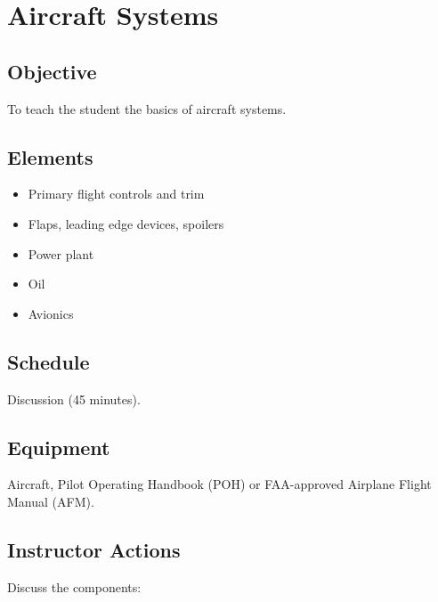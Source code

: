 \section{Aircraft Systems}

\subsection{Objective}

To teach the student the basics of aircraft systems.

\subsection{Elements}

\begin{itemize}
  \item Primary flight controls and trim
  \item Flaps, leading edge devices, spoilers
  \item Power plant
  \item Oil
  \item Avionics
\end{itemize}

\subsection{Schedule}

Discussion (45 minutes).

\subsection{Equipment}

Aircraft, Pilot Operating Handbook (POH) or FAA-approved Airplane Flight Manual
(AFM).

\subsection{Instructor Actions}

Discuss the components:


